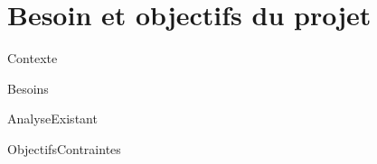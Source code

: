 \chapter{Besoin et objectifs du projet}


{Contexte}

{Besoins}

{AnalyseExistant}

{ObjectifsContraintes}

